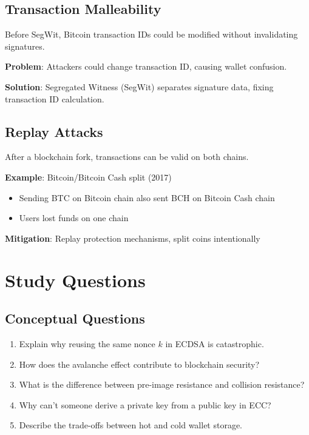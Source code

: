 \documentclass[11pt,a4paper]{article}
\begin{document}
\subsection{Transaction Malleability}

Before SegWit, Bitcoin transaction IDs could be modified without invalidating signatures.

\textbf{Problem}: Attackers could change transaction ID, causing wallet confusion.

\textbf{Solution}: Segregated Witness (SegWit) separates signature data, fixing transaction ID calculation.

\subsection{Replay Attacks}

After a blockchain fork, transactions can be valid on both chains.

\textbf{Example}: Bitcoin/Bitcoin Cash split (2017)
\begin{itemize}
  \item Sending BTC on Bitcoin chain also sent BCH on Bitcoin Cash chain
  \item Users lost funds on one chain
\end{itemize}

\textbf{Mitigation}: Replay protection mechanisms, split coins intentionally

\section{Study Questions}

\subsection{Conceptual Questions}

\begin{enumerate}
  \item Explain why reusing the same nonce $k$ in ECDSA is catastrophic.
  \item How does the avalanche effect contribute to blockchain security?
  \item What is the difference between pre-image resistance and collision resistance?
  \item Why can't someone derive a private key from a public key in ECC?
  \item Describe the trade-offs between hot and cold wallet storage.
\end{enumerate}
\end{document}
